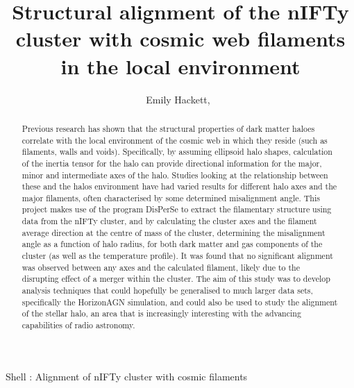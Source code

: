 \documentclass[journal]{IEEEtran}
\begin{document}
\title{Structural alignment of the nIFTy cluster with cosmic web filaments in the local environment}
\author{Emily Hackett,~}
{Shell \MakeLowercase{}: Alignment of nIFTy cluster with cosmic filaments}

\maketitle

\begin{abstract}
	Previous research has shown that the structural properties of dark matter haloes correlate with the local environment of the cosmic web in which they reside (such as filaments, walls and voids). Specifically, by assuming ellipsoid halo shapes, calculation of the inertia tensor for the halo can provide directional information for the major, minor and intermediate axes of the halo. Studies looking at the relationship between these and the halos environment have had varied results for different halo axes and the major filaments, often characterised by some determined misalignment angle. This project makes use of the program DisPerSe to extract the filamentary structure using data from the nIFTy cluster, and by calculating the cluster axes and the filament average direction at the centre of mass of the cluster, determining the misalignment angle as a function of halo radius, for both dark matter and gas components of the cluster (as well as the temperature profile). It was found that no significant alignment was observed between any axes and the calculated filament, likely due to the disrupting effect of a merger within the cluster. The aim of this study was to develop analysis techniques that could hopefully be generalised to much larger data sets, specifically the HorizonAGN simulation, and could also be used to study the alignment of the stellar halo, an area that is increasingly interesting with the advancing capabilities of radio astronomy. 
\end{abstract}

\end{document}
